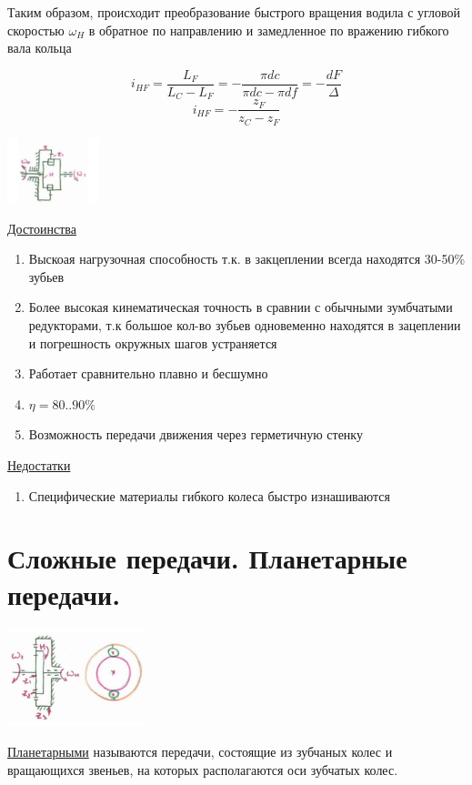\documentclass{article}
\begin{document}
\begin{multicols}{3}
Таким образом, происходит преобразование быстрого вращения водила с угловой скоростью $\omega_H$ в обратное по направлению и замедленное по вражению гибкого вала кольца

$$
i_{HF} = \frac{L_F}{L_C - L_F}  = - \frac{\pi dc}{\pi dc - \pi df} = - \frac{dF}{ \Delta} 
$$
$$
i_{HF} = - \frac{z_F}{z_C - z_F} 
$$

\includegraphics[width = 0.2\textwidth]{15_2}

\underline{Достоинства} 
\begin{enumerate}
	\item Выскоая нагрузочная способность т.к. в закцеплении всегда находятся 30-50\% зубьев
	\item Более высокая кинематическая точность в сравнии с обычными зумбчатыми редукторами, т.к большое кол-во зубьев одновеменно находятся в зацеплении и погрешность окружных шагов устраняется
	\item Работает сравнительно плавно и бесшумно
	\item $\eta = 80 .. 90 \%$
	\item Возможность передачи движения через герметичную стенку
\end{enumerate}
\underline{Недостатки}
\begin{enumerate}
	\item Специфические материалы гибкого колеса быстро изнашиваются
\end{enumerate}

\section {Сложные передачи. Планетарные передачи.}

\includegraphics[width = 0.3\textwidth]{16_1}

\underline{Планетарными} называются передачи, состоящие из зубчаных колес и вращающихся звеньев, на которых располагаются оси зубчатых колес.


\end{multicols}
\end{document}
